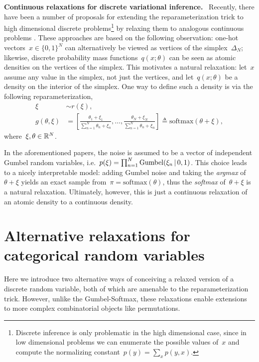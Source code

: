 \documentclass[twoside]{article}
\DeclareRobustCommand{\parhead}[1]{\textbf{#1}~}
\begin{document}
\parhead{Continuous relaxations for discrete variational inference.}
Recently, there have been a number of proposals for extending the
reparameterization trick to high dimensional discrete
problems\footnote{Discrete inference is only problematic in the high
  dimensional case, since in low dimensional problems we can enumerate
  the possible values of~$x$ and compute the normalizing
  constant~$p(y) = \sum_x p(y, x)$.} by relaxing them to analogous
continuous problems \citep{maddison2016concrete, jang2016categorical,
  kusner2016gans}.  These approaches are based on the following
observation: one-hot vectors~$x \in \{0,1\}^N$ can alternatively be
viewed as vertices of the simplex~$\Delta_N$; likewise, discrete
probability mass functions~$q(x; \theta)$ can be seen as atomic
densities on the vertices of the simplex.  This motivates a natural
relaxation: let~$x$ assume any value in the simplex, not just the
vertices, and let~$q(x; \theta)$ be a density on the interior of the
simplex.  One way to define such a density is via the following
reparameterization,
\begin{align}
  \xi &\sim r(\xi), \\
  g(\theta, \xi) &= \left[ \frac{\theta_1 + \xi_1}{\sum_{n=1}^N \theta_n + \xi_n},
      \ldots,
      \frac{\theta_N + \xi_N}{\sum_{n=1}^N \theta_n + \xi_n}
      \right]
    \triangleq \mathrm{softmax}(\theta + \xi),
\end{align}
where~${\xi, \theta \in \mathbb{R}^N}$.  

In the aforementioned papers, the noise is assumed to be a vector of
independent Gumbel random variables,
i.e.~${p(\xi) = \prod_{n=1}^N \mathrm{Gumbel}(\xi_n \, | \, 0, 1)}$.
This choice leads to a nicely interpretable model: adding Gumbel noise
and taking the \emph{argmax} of~$\theta + \xi$ yields an exact sample from~$\pi = \mathrm{softmax}(\theta)$, thus
the \emph{softmax} of~$\theta + \xi$ is a natural relaxation. Ultimately,
however, this is just a continuous relaxation of an atomic density to
a continuous density.

\section{Alternative relaxations for categorical random variables}
\label{sec:alternative}
Here we introduce two alternative ways of conceiving a relaxed version
of a discrete random variable, both of which are amenable to the
reparameterization trick. However, unlike the Gumbel-Softmax, these
relaxations enable extensions to more complex combinatorial objects
like permutations.
\end{document}
